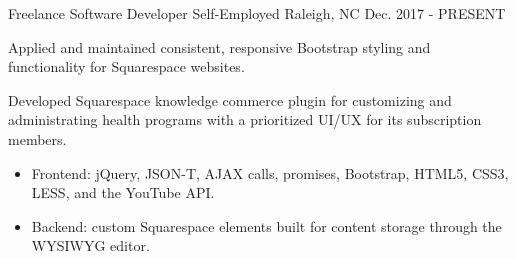 \begin{cventries}

  \cventry
    {Freelance Software Developer} %
    {Self-Employed} %
    {Raleigh, NC} %
    {Dec. 2017 - PRESENT} %
    {
      \begin{cvitems} %
        \item {Applied and maintained consistent, responsive Bootstrap styling and functionality for Squarespace websites.}
        \item {Developed Squarespace knowledge commerce plugin for customizing and administrating health programs with a prioritized UI/UX for its subscription members.}
        \begin{itemize}
          \vspace{1.0mm}
          \item {Frontend: jQuery, JSON-T, AJAX calls, promises, Bootstrap, HTML5, CSS3, LESS, and the YouTube API.}
          \vspace{1.0mm}
          \item {Backend: custom Squarespace elements built for content storage through the WYSIWYG editor.}
        \end{itemize}
      \end{cvitems}
    }


\end{cventries}
